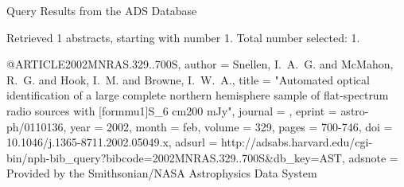 Query Results from the ADS Database


Retrieved 1 abstracts, starting with number 1.  Total number selected: 1.

@ARTICLE{2002MNRAS.329..700S,
   author = {{Snellen}, I.~A.~G. and {McMahon}, R.~G. and {Hook}, I.~M. and 
	{Browne}, I.~W.~A.},
    title = "{Automated optical identification of a large complete northern hemisphere sample of flat-spectrum radio sources with [formmu1]S_{6 cm}{\gt}200 mJy}",
  journal = {\mnras},
   eprint = {astro-ph/0110136},
     year = 2002,
    month = feb,
   volume = 329,
    pages = {700-746},
      doi = {10.1046/j.1365-8711.2002.05049.x},
   adsurl = {http://adsabs.harvard.edu/cgi-bin/nph-bib_query?bibcode=2002MNRAS.329..700S&db_key=AST},
  adsnote = {Provided by the Smithsonian/NASA Astrophysics Data System}
}


